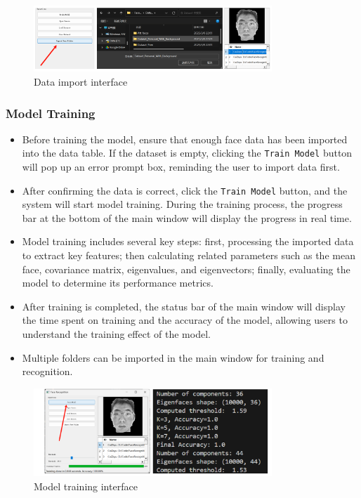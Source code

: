 \documentclass{article}
\begin{document}
\begin{figure}[H]
    \centering
    \includegraphics[width=0.8\textwidth]{Img/PixPin_2025-03-09_00-48-16.png}
    \caption{Data import interface}
\end{figure}

\subsubsection{Model Training}
\begin{itemize}
    \item Before training the model, ensure that enough face data has been imported into the data table. If the dataset is empty, clicking the \texttt{Train Model} button will pop up an error prompt box, reminding the user to import data first.
    \item After confirming the data is correct, click the \texttt{Train Model} button, and the system will start model training. During the training process, the progress bar at the bottom of the main window will display the progress in real time.
    \item Model training includes several key steps: first, processing the imported data to extract key features; then calculating related parameters such as the mean face, covariance matrix, eigenvalues, and eigenvectors; finally, evaluating the model to determine its performance metrics.
    \item After training is completed, the status bar of the main window will display the time spent on training and the accuracy of the model, allowing users to understand the training effect of the model.
    \item Multiple folders can be imported in the main window for training and recognition.
\end{itemize}

\begin{figure}[H]
    \centering
    \includegraphics[width=0.8\textwidth]{Img/PixPin_2025-03-09_00-52-21.png}
    \caption{Model training interface}
\end{figure}
\end{document}
